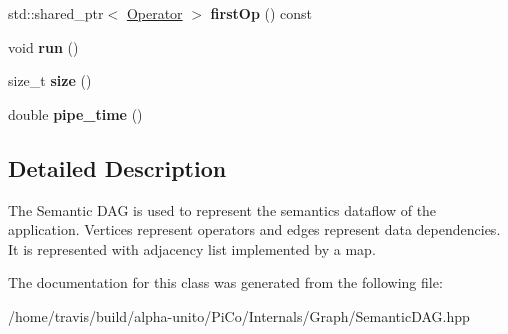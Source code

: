 \begin{DoxyCompactItemize}
\item 
\hypertarget{class_semantic_d_a_g_ab96250cbbb40055b878c59e3bdd49961}{std\-::shared\-\_\-ptr$<$ \hyperlink{class_operator}{\-Operator} $>$ {\bfseries first\-Op} () const }\label{class_semantic_d_a_g_ab96250cbbb40055b878c59e3bdd49961}

\item 
\hypertarget{class_semantic_d_a_g_af4c527c88b2d24640e11fa16a8caf6a1}{void {\bfseries run} ()}\label{class_semantic_d_a_g_af4c527c88b2d24640e11fa16a8caf6a1}

\item 
\hypertarget{class_semantic_d_a_g_a08f38d352f8443b9df101dd3d319829e}{size\-\_\-t {\bfseries size} ()}\label{class_semantic_d_a_g_a08f38d352f8443b9df101dd3d319829e}

\item 
\hypertarget{class_semantic_d_a_g_a0c954bbbafef3cbd347b9125a941767f}{double {\bfseries pipe\-\_\-time} ()}\label{class_semantic_d_a_g_a0c954bbbafef3cbd347b9125a941767f}

\end{DoxyCompactItemize}


\subsection{\-Detailed \-Description}
\-The \-Semantic \-D\-A\-G is used to represent the semantics dataflow of the application. \-Vertices represent operators and edges represent data dependencies. \-It is represented with adjacency list implemented by a map. 

\-The documentation for this class was generated from the following file\-:\begin{DoxyCompactItemize}
\item 
/home/travis/build/alpha-\/unito/\-Pi\-Co/\-Internals/\-Graph/\-Semantic\-D\-A\-G.\-hpp\end{DoxyCompactItemize}
